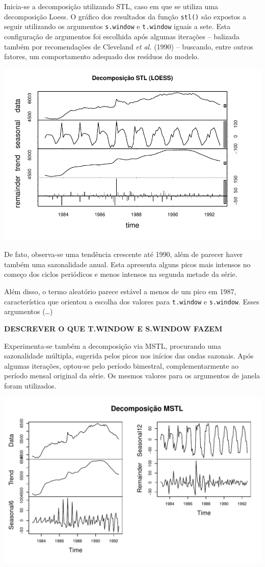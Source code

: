\documentclass[
  letterpaper,
  DIV=11,
  numbers=noendperiod]{scrartcl}
\begin{document}
Inicia-se a decomposição utilizando STL, caso em que se utiliza uma
decomposição Loess. O gráfico dos resultados da função \texttt{stl()}
são expostos a seguir utilizando os argumentos \texttt{s.window} e
\texttt{t.window} iguais a sete. Esta configuração de argumentos foi
escolhida após algumas iterações -- balizada também por recomendações de
Cleveland \emph{et al.} (1990) -- buscando, entre outros fatores, um
comportamento adequado dos resíduos do modelo.

\includegraphics{T1_grupo15_files/figure-pdf/STL-1.pdf}

De fato, observa-se uma tendência crescente até 1990, além de parecer
haver também uma sazonalidade anual. Esta apresenta alguns picos mais
intensos no começo dos ciclos periódicos e menos intensos na segunda
metade da série.

Além disso, o termo aleatório parece estável a menos de um pico em 1987,
característica que orientou a escolha dos valores para \texttt{t.window}
e \texttt{s.window}. Esses argumentos (\ldots)

\textbf{DESCREVER O QUE T.WINDOW E S.WINDOW FAZEM}

Experimenta-se também a decomposição via MSTL, procurando uma
sazonalidade múltipla, sugerida pelos picos nos inícios das ondas
sazonais. Após algumas iterações, optou-se pelo período bimestral,
complementarmente ao período mensal original da série. Os mesmos valores
para os argumentos de janela foram utilizados.

\includegraphics{T1_grupo15_files/figure-pdf/unnamed-chunk-1-1.pdf}
\end{document}
